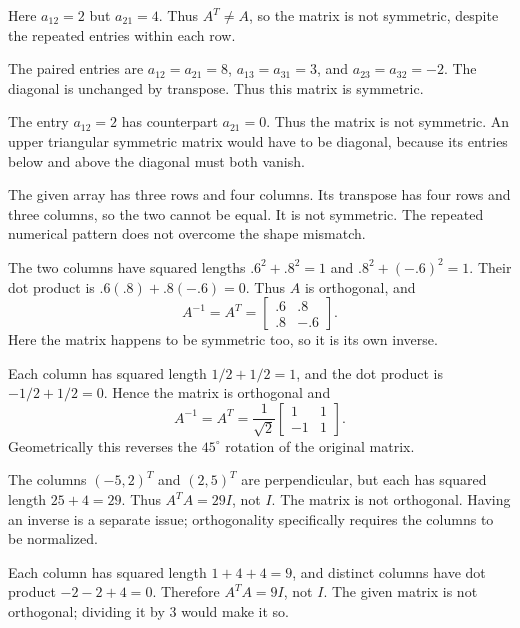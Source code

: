 Here $a_{12}=2$ but $a_{21}=4$. Thus $A^T\ne A$, so the matrix is
not symmetric, despite the repeated entries within each row.

The paired entries are $a_{12}=a_{21}=8$,
$a_{13}=a_{31}=3$, and $a_{23}=a_{32}=-2$.
The diagonal is unchanged by transpose. Thus this matrix is symmetric.

The entry $a_{12}=2$ has counterpart $a_{21}=0$.
Thus the matrix is not symmetric. An upper triangular symmetric matrix
would have to be diagonal, because its entries below and above the diagonal
must both vanish.

The given array has three rows and four columns. Its transpose has four
rows and three columns, so the two cannot be equal. It is not symmetric.
The repeated numerical pattern does not overcome the shape mismatch.

The two columns have squared lengths $.6^2+.8^2=1$ and
$.8^2+(-.6)^2=1$. Their dot product is $.6(.8)+.8(-.6)=0$.
Thus $A$ is orthogonal, and
\[
 A^{-1}=A^T=\begin{bmatrix}.6&.8\\.8&-.6\end{bmatrix}.
\]
Here the matrix happens to be symmetric too, so it is its own inverse.

Each column has squared length $1/2+1/2=1$, and the dot product is
$-1/2+1/2=0$. Hence the matrix is orthogonal and
\[
 A^{-1}=A^T=\frac1{\sqrt2}\begin{bmatrix}1&1\\-1&1\end{bmatrix}.
\]
Geometrically this reverses the $45^\circ$ rotation of the original matrix.

The columns $(-5,2)^T$ and $(2,5)^T$ are perpendicular, but each has
squared length $25+4=29$. Thus $A^TA=29I$, not $I$.
The matrix is not orthogonal. Having an inverse is a separate issue;
orthogonality specifically requires the columns to be normalized.

Each column has squared length $1+4+4=9$, and distinct columns have
dot product $-2-2+4=0$. Therefore $A^TA=9I$, not $I$.
The given matrix is not orthogonal; dividing it by $3$ would make it so.

